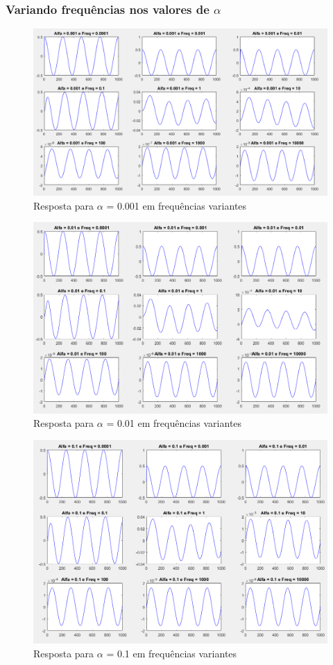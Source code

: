\documentclass[a4paper, 12pt]{article}
\begin{document}
	\subsubsection{Variando frequências nos valores de $\alpha$}
			\begin{figure}[!ht]
				\centering
				\includegraphics[scale=0.45]{img/3k_alfa1.png}
				\caption{Resposta para $\alpha$ = 0.001 em frequências variantes}
			\end{figure}
			\begin{figure}[!ht]
				\centering
				\includegraphics[scale=0.48]{img/3k_alfa2.png}
				\caption{Resposta para $\alpha$ = 0.01 em frequências variantes}
			\end{figure}
			\begin{figure}[!ht]
				\centering
				\includegraphics[scale=0.48]{img/3k_alfa3.png}
				\caption{Resposta para $\alpha$ = 0.1 em frequências variantes}
			\end{figure}
\end{document}
